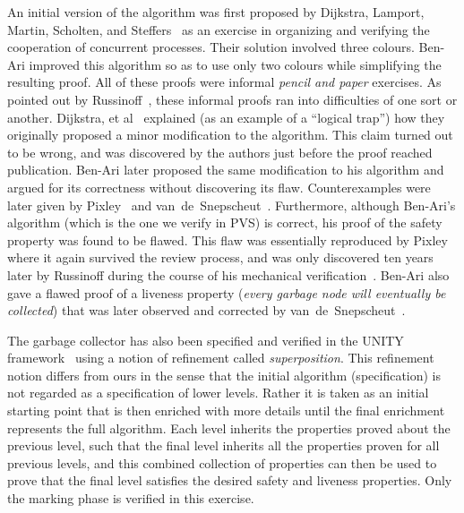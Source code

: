 An initial  version of the algorithm  was  first proposed by Dijkstra,
Lamport, Martin, Scholten, and Steffers~\cite{DLMSS:GC} as an exercise
in  organizing and verifying the cooperation  of concurrent processes. 
Their solution   involved   three  colours.   Ben-Ari    improved this
algorithm so  as  to use    only  two colours  while  simplifying  the
resulting proof.  All of these  proofs were  informal {\em pencil  and
  paper\/} exercises.  As   pointed  out by   Russinoff~\cite{Rus:GC},
these informal proofs  ran into difficulties  of one sort or  another. 
Dijkstra, et al~\cite{DLMSS:GC}    explained   (as an  example  of   a
``logical trap'') how they originally proposed a minor modification to
the  algorithm.   This claim turned   out  to   be  wrong, and  was
discovered by the authors just  before the proof reached publication.  
Ben-Ari  later  proposed the same  modification   to his algorithm and
argued for   its    correctness   without  discovering its       flaw. 
Counterexamples    were  later  given    by  Pixley~\cite{Pix:GC}  and
van~de~Snepscheut~\cite{Van:GC}.   Furthermore,  although    Ben-Ari's
algorithm (which is the one we verify in PVS) is correct, his proof of
the safety property was found to be flawed.  This flaw was essentially
reproduced by Pixley \cite{Pix:GC} where it  again survived the  review
process, and was only discovered  ten years later by Russinoff  during
the course of his mechanical verification~\cite{Rus:GC}.  Ben-Ari also
gave a flawed  proof of a liveness  property ({\em every garbage  node
  will eventually be collected}) that was later observed and corrected
by van~de~Snepscheut~\cite{Van:GC}.

The garbage collector  has  also been  specified  and verified in  the
UNITY  framework~\cite{CM:UNITY} using a  notion of  refinement called
{\em superposition}.  This refinement notion differs  from ours in the
sense that the initial algorithm (specification)  is not regarded as a
specification of lower levels.   Rather   it is  taken as an   initial
starting point that is then enriched with more details until the final
enrichment   represents the full   algorithm.  Each level inherits the
properties proved about the previous  level, such that the final level
inherits  all the properties proven  for all previous levels, and this
combined collection of  properties can then be used  to prove that the
final level satisfies  the desired  safety  and liveness  properties.  
Only the marking phase is verified in this exercise.

